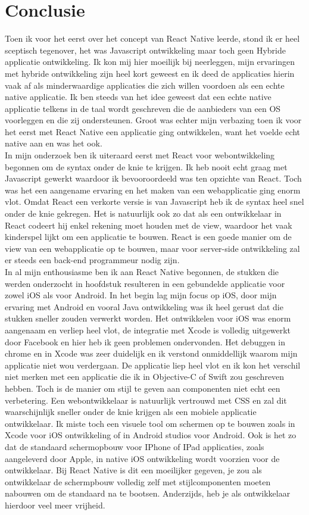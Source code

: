 \chapter{Conclusie}
Toen ik voor het eerst over het concept van React Native leerde, stond ik er heel sceptisch tegenover, het was Javascript ontwikkeling maar toch geen Hybride applicatie ontwikkeling. Ik kon mij hier moeilijk bij neerleggen, mijn ervaringen met hybride ontwikkeling zijn heel kort geweest en ik deed de applicaties hierin vaak af als minderwaardige applicaties die zich willen voordoen als een echte native applicatie. Ik ben steeds van het idee geweest dat een echte native applicatie telkens in de taal wordt geschreven die de aanbieders van een OS voorleggen en die zij ondersteunen. Groot was echter mijn verbazing toen ik voor het eerst met React Native een applicatie ging ontwikkelen, want het voelde echt native aan en was het ook.\\
	In mijn onderzoek ben ik uiteraard eerst met React voor webontwikkeling begonnen om de syntax onder de knie te krijgen. Ik heb nooit echt graag met Javascript gewerkt waardoor ik bevooroordeeld was ten opzichte van React. Toch was het een aangename ervaring en het maken van een webapplicatie ging enorm vlot. Omdat React een verkorte versie is van Javascript heb ik de syntax heel snel onder de knie gekregen. Het is natuurlijk ook zo dat als een ontwikkelaar in React codeert hij enkel rekening moet houden met de view, waardoor het vaak kinderspel lijkt om een applicatie te bouwen. React is een goede manier om de view van een webapplicatie op te bouwen, maar voor server-side ontwikkeling zal er steeds een back-end programmeur nodig zijn. \\
	In al mijn enthousiasme ben ik aan React Native begonnen, de stukken die werden onderzocht in hoofdstuk  resulteren in een gebundelde applicatie voor zowel iOS als voor Android. In het begin lag mijn focus op iOS, door mijn ervaring met Android en vooral Java ontwikkeling was ik heel gerust dat die stukken sneller zouden verwerkt worden. Het ontwikkelen voor iOS was enorm aangenaam en verliep heel vlot, de integratie met Xcode is volledig uitgewerkt door Facebook en hier heb ik geen problemen ondervonden. Het debuggen in chrome en in Xcode was zeer duidelijk en ik verstond onmiddellijk waarom mijn applicatie niet wou verdergaan. De applicatie liep heel vlot en ik kon het verschil niet merken met een applicatie die ik in Objective-C of Swift zou geschreven hebben. Toch is de manier om stijl te geven aan componenten niet echt een verbetering. Een webontwikkelaar is natuurlijk vertrouwd met CSS en zal dit waarschijnlijk sneller onder de knie krijgen als een mobiele applicatie ontwikkelaar. Ik miste toch een visuele tool om schermen op te bouwen zoals in Xcode voor iOS ontwikkeling of in Android studios voor Android. Ook is het zo dat de standaard schermopbouw voor IPhone of IPad applicaties, zoals aangeleverd door Apple, in native iOS ontwikkeling wordt voorzien voor de ontwikkelaar. Bij React Native is dit een moeilijker gegeven, je zou als ontwikkelaar de schermpbouw volledig zelf met stijlcomponenten moeten nabouwen om de standaard na te bootsen. Anderzijds, heb je als ontwikkelaar hierdoor veel meer vrijheid. \\
